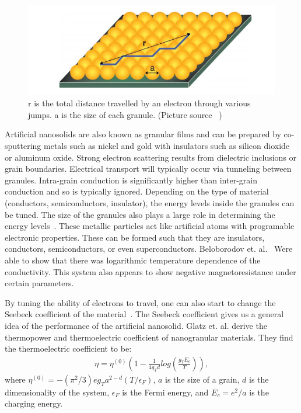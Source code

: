 \begin{figure}[htbp]
\begin{center}
\includegraphics[scale=.50]{granuleHop.png}
\caption{ r is the total distance travelled by an electron through various jumps. a is the size of each granule. (Picture source ~\cite{glatz08})}
\label{hopping}
\end{center}
\end{figure}


Artificial nanosolids are also known as granular films and can be prepared by co-sputtering metals such as nickel and gold with insulators such as silicon dioxide or aluminum oxide. Strong electron scattering results from dielectric inclusions or grain boundaries. Electrical transport will typically occur via tunneling between granules. Intra-grain conduction is significantly higher than inter-grain conduction and so is typically ignored. Depending on the type of material (conductors, semiconductors, insulator), the energy levels inside the granules can be tuned. The size of the granules also plays a large role in determining the energy levels~\cite{Abeles75}.  These metallic particles act like artificial atoms with programable electronic properties. These can be formed such that they are insulators, conductors, semiconductors, or even superconductors. Beloborodov et. al.~\cite{Beloborodov07}  Were able to show that there was logarithmic temperature dependence of the conductivity. This system also appears to show negative magnetoresistance under certain parameters.

By tuning the ability of electrons to travel, one can also start to change the Seebeck coefficient of the material~\cite{glatz09}. The Seebeck coefficient gives us a general idea of the performance of the artificial nanosolid. Glatz et. al. derive the thermopower and thermoelectric coefficient of nanogranular materials. They find the thermoelectric coefficient to be:
\begin{eqnarray}
\eta = \eta^{(0)} (1 - \frac{1} {4 g_T d} log( \frac{g_T E_c} {T} )),
\label{thermoelectric}
\end{eqnarray}
where $\eta^{(0)} = -(\pi^2 / 3) e g_T a^{2-d} (T/ \epsilon_F)$, $a$ is the size of a grain, $d$ is the dimensionality of the system, $\epsilon_F$ is the Fermi energy, and $E_c = e^2 /a$ is the charging energy.


